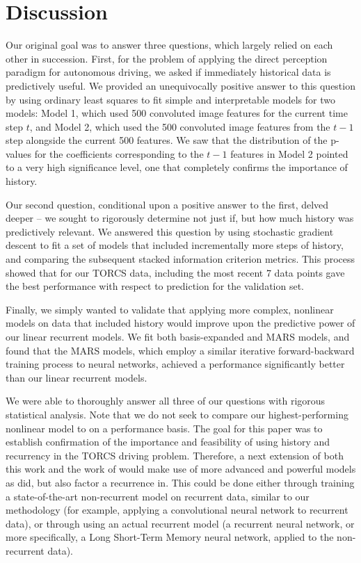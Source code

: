 \documentclass[master]{subfiles}
\begin{document}
\section{Discussion}\label{sec:discussion}
Our original goal was to answer three questions, which largely relied on each other in succession.  First, for the problem of applying the direct perception paradigm for autonomous driving, we asked if immediately historical data is predictively useful.  We provided an unequivocally positive answer to this question by using ordinary least squares to fit simple and interpretable models for two models: Model 1, which used 500 convoluted image features for the current time step $t$, and Model 2, which used the 500 convoluted image features from the $t-1$ step alongside the current 500 features.  We saw that the distribution of the p-values for the coefficients corresponding to the $t-1$ features in Model 2 pointed to a very high significance level, one that completely confirms the importance of history.\par
Our second question, conditional upon a positive answer to the first, delved deeper -- we sought to rigorously determine not just if, but how much history was predictively relevant.  We answered this question by using stochastic gradient descent to fit a set of models that included incrementally more steps of history, and comparing the subsequent stacked information criterion metrics.  This process showed that for our TORCS data, including the most recent 7 data points gave the best performance with respect to prediction for the validation set.\par
Finally, we simply wanted to validate that applying more complex, nonlinear models on data that included history would improve upon the predictive power of our linear recurrent models.  We fit both basis-expanded and MARS models, and found that the MARS models, which employ a similar iterative forward-backward training process to neural networks, achieved a performance significantly better than our linear recurrent models.\par
We were able to thoroughly answer all three of our questions with rigorous statistical analysis.  Note that we do not seek to compare our highest-performing nonlinear model to \cite{deepdriving} on a performance basis.  The goal for this paper was to establish confirmation of the importance and feasibility of using history and recurrency in the TORCS driving problem.  Therefore, a next extension of both this work and the work of \cite{deepdriving} would make use of more advanced and powerful models as \cite{deepdriving} did, but also factor a recurrence in.  This could be done either through training a state-of-the-art non-recurrent model on recurrent data, similar to our methodology (for example, applying a convolutional neural network to recurrent data), or through using an actual recurrent model (a recurrent neural network, or more specifically, a Long Short-Term Memory neural network, applied to the non-recurrent data).
\end{document}
